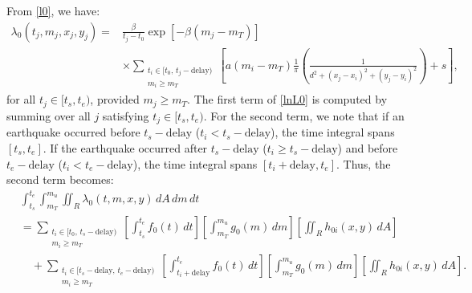 \documentclass[extra,mreferee]{gji}
\theoremstyle{lemma}
\begin{document}
From \eqref{l0}, we have:
\begin{equation}\label{l01}
\begin{aligned}
\lambda_0(t_j, m_j, x_j, y_j) = &\frac{\beta}{t_j - t_0} \exp[-\beta(m_j - m_T)] \\
&\times \sum_{\substack{t_i \in [t_0,\,t_j - \mathrm{delay})\\ m_i \geq m_T}} \left[a(m_i - m_T) \frac{1}{\pi} \left( \frac{1}{d^2 + (x_j - x_i)^2 + (y_j - y_i)^2} \right) + s \right],
\end{aligned}
\end{equation}
for all $t_j \in [t_s, t_e)$, provided $m_j \geq m_T$. The first term of \eqref{lnL0} is computed by summing over all $j$ satisfying $t_j \in [t_s, t_e)$. For the second term, we note that if an earthquake occurred before $t_s-\mathrm{delay}$ ($t_i<t_s-\mathrm{delay}$), the time integral spans $[t_s, t_e]$. If the earthquake occurred after $t_s-\mathrm{delay}$ ($t_i\geq t_s-\mathrm{delay}$) and before $t_e-\mathrm{delay}$ ($t_i<t_e-\mathrm{delay}$), the time integral spans $[t_i + \mathrm{delay}, t_e]$. Thus, the second term becomes:
\begin{equation}\label{l02}
\begin{aligned}
&\int_{t_s}^{t_e} \int_{m_T}^{m_u} \iint_{R} \lambda_0(t,m,x,y)\, dA\, dm\, dt \\
&= \sum_{\substack{t_i \in [t_0,\, t_s - \mathrm{delay})\\ m_i \geq m_T}} 
\left[ \int_{t_s}^{t_e} f_0(t)\, dt \right] 
\left[ \int_{m_T}^{m_u} g_0(m)\, dm \right] 
\left[ \iint_R h_{0i}(x,y)\, dA \right] \\
&\quad + \sum_{\substack{t_i \in [t_s - \mathrm{delay},\, t_e - \mathrm{delay})\\ m_i \geq m_T}} 
\left[ \int_{t_i + \mathrm{delay}}^{t_e} f_0(t)\, dt \right] 
\left[ \int_{m_T}^{m_u} g_0(m)\, dm \right] 
\left[ \iint_R h_{0i}(x,y)\, dA \right].
\end{aligned}
\end{equation}
\end{document}
